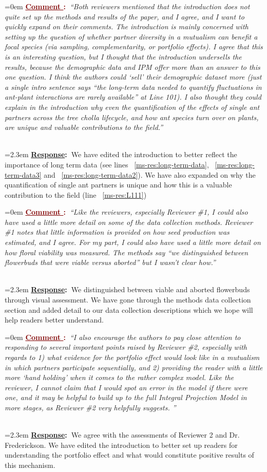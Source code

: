 \documentclass[12pt]{article}
\newcounter{cN}
\newcommand{\comment}[1]{
	\vspace{2em}
	\refstepcounter{cN} %
	\noindent \hangindent=0em \textbf{\textcolor{Maroon}{\uline{Comment \thecN}:~}}\emph{``#1''}
	}
\newcommand{\response}[1]{
	\\[0.25em]
	\hangindent=2.3em \textbf{\textcolor{NavyBlue}{\uline{Response}:~}}#1
	}
\begin{document}
\comment{Both reviewers mentioned that the introduction does not quite set up the methods and results of the paper, and I agree, and I want to quickly expand on their comments. 
The introduction is mainly concerned with setting up the question of whether partner diversity in a mutualism can benefit a focal species (via sampling, complementarity, or portfolio effects). 
I agree that this is an interesting question, but I thought that the introduction undersells the results, because the demographic data and IPM offer more than an answer to this one question. 
I think the authors could ‘sell’ their demographic dataset more (just a single intro sentence says “the long-term data needed to quantify fluctuations in ant-plant interactions are rarely available” at Line 101). 
I also thought they could explain in the introduction why even the quantification of the effects of single ant partners across the tree cholla lifecycle, and how ant species turn over on plants, are unique and valuable contributions to the field.}
\response{We have edited the introduction to better reflect the importance of long term data (see lines ~\ref{ms-res:long-term-data}, ~\ref{ms-res:long-term-data3} and ~\ref{ms-res:long-term-data2}). 
We have also expanded on why the quantification of single ant partners is unique and how this is a valuable contribution to the field (line ~\ref{ms-res:L111})
}

\comment{Like the reviewers, especially Reviewer \#1, I could also have used a little more detail on some of the data collection methods. Reviewer \#1 notes that little information is provided on how seed production was estimated, and I agree. For my part, I could also have used a little more detail on how floral viability was measured. The methods say “we distinguished between flowerbuds that were viable versus aborted” but I wasn’t clear how.}
\response{We distinguished between viable and aborted flowerbuds through visual assessment. We have gone through the methods data collection section and added detail to our data collection descriptions which we hope will help readers better understand.}

\comment{I also encourage the authors to pay close attention to responding to several important points raised by Reviewer \#2, especially with regards to 1) what evidence for the portfolio effect would look like in a mutualism in which partners participate sequentially, and 2) providing the reader with a little more ‘hand holding’ when it comes to the rather complex model. Like the reviewer, I cannot claim that I would spot an error in the model if there were one, and it may be helpful to build up to the full Integral Projection Model in more stages, as Reviewer \#2 very helpfully suggests. }
\response{We agree with the assessments of Reviewer 2 and Dr. Frederickson. We have edited the introduction to better set up readers for understanding the portfolio effect and what would constitute positive results of this mechanism.}
\end{document}

